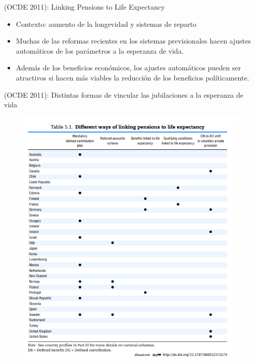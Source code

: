 \documentclass[ignorenonframetext,]{beamer}
\providecommand{\tightlist}{%
  \setlength{\itemsep}{0pt}\setlength{\parskip}{0pt}}
\begin{document}
\begin{frame}{(OCDE 2011): Linking Pensions to Life Expectancy}

\begin{itemize}
\tightlist
\item
  Contexto: aumento de la longevidad y sistemas de reparto
\item
  Muchas de las reformas recientes en los sistemas previsionales hacen
  ajustes automáticos de los parámetros a la esperanza de vida.
\item
  Además de los beneficios económicos, los ajustes automáticos pueden
  ser atractivos si hacen más viables la reducción de los beneficios
  políticamente.
\end{itemize}

\end{frame}

\begin{frame}{(OCDE 2011): Distintas formas de vincular las jubilaciones
a la esperanza de vida}

\begin{figure}
\centering
\includegraphics{imgs_reforma/ocde.png}
\caption{}
\end{figure}

\end{frame}
\end{document}
